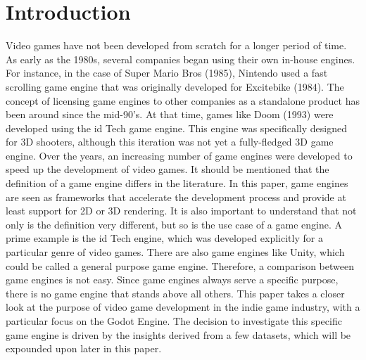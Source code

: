 \section{Introduction}
Video games have not been developed from scratch for a longer period of time.
As early as the 1980s, several companies began using their own in-house engines.
For instance, in the case of Super Mario Bros (1985), Nintendo used a fast scrolling game engine that was originally developed for Excitebike (1984)\cite{history-digital-games}.
The concept of licensing game engines to other companies as a standalone product has been around since the mid-90's.
At that time, games like Doom (1993) were developed using the id Tech game engine\cite{id-tech-doom}.
This engine was specifically designed for 3D shooters, although this iteration was not yet a fully-fledged 3D game engine.
Over the years, an increasing number of game engines were developed to speed up the development of video games.
It should be mentioned that the definition of a game engine differs in the literature.
In this paper, game engines are seen as frameworks that accelerate the development process and provide at least support for 2D or 3D rendering.
It is also important to understand that not only is the definition very different, but so is the use case of a game engine.
A prime example is the id Tech engine, which was developed explicitly for a particular genre of video games.
There are also game engines like Unity, which could be called a general purpose game engine.
Therefore, a comparison between game engines is not easy.
Since game engines always serve a specific purpose, there is no game engine that stands above all others.
This paper takes a closer look at the purpose of video game development in the indie game industry, with a particular focus on the Godot Engine.
The decision to investigate this specific game engine is driven by the insights derived from a few datasets, which will be expounded upon later in this paper.
